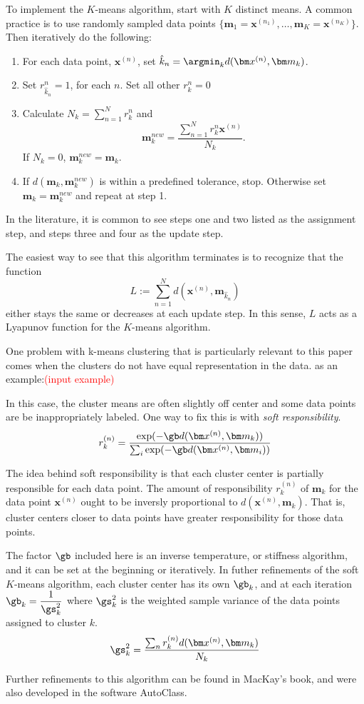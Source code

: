 To implement the \(K\)-means algorithm, start with \(K\) distinct means.  
A common practice is to use randomly sampled data points 
\(\{\bm m_1 = \bm x^{(n_1)},\ldots,\bm m_K = \bm x^{(n_K)}\}\). Then iteratively 
do the following:
\begin{enumerate}
	\item For each data point, \(\bm x^{(n)}\), set 
	\(\hat{k}_n = \argmin_k d(\bm x^{(n)},\bm m_k)\).
	\item Set \(r_{\hat{k}_n}^{n} = 1\), for each \(n\). Set all other 
	\(r_k^n = 0\)
	\item Calculate \(N_k = \sum_{n=1}^{N} r^n_k\) and 
	\[\bm m_k^{new} = \frac{\sum_{n=1}^{N} r_k^n \bm x^{(n)}}{N_k}.\]
	If \(N_k = 0\), \(\bm m_k^{new} = \bm m_k\).
	\item If \(d(\bm m_k ,\bm m_k^{new})\) is within a predefined tolerance, 
	stop.  Otherwise set \(\bm m_k = \bm m_k^{new}\) and repeat at step 1.
\end{enumerate}
In the literature, it is common to see steps one and two listed as the 
assignment step, and steps three and four as the update step.  

The easiest way to see that this algorithm terminates is to recognize that the 
function \[L := \sum_{n=1}^{N} d(\bm x^{(n)},\bm m_{\hat{k}_n})\]
either stays the same or decreases at each update step.  In this sense, \(L\) 
acts as a Lyapunov function for the \(K\)-means algorithm.

One problem with k-means clustering that is particularly relevant to this 
paper comes when the clusters do not have equal representation in the data.
as an example:\textcolor{red}{(input example)}

In this case, the cluster means are often slightly off center and some data 
points are be inappropriately labeled. %
One way to fix this is with \textit{soft responsibility}. 
\[r_k^{(n)} = \frac{\exp(-\gb d(\bm x^{(n)},\bm m_k))}
{\sum_i \exp(-\gb d(\bm x^{(n)},\bm m_i))}\]

The idea behind soft responsibility is that each cluster center is partially 
responsible for each data point.  The amount of responsibility \(r_k^{(n)}\) 
of \(\bm m_k\) for the data point \(\bm x^{(n)}\) ought to be inversly 
proportional to \(d(\bm x^{(n)},\bm m_k)\). That is, cluster centers closer to 
data points have greater responsibility for those data points.  

The factor \(\gb\) included here is an inverse temperature, or stiffness 
algorithm, and it can be set at the beginning or iteratively.  In futher 
refinements of the soft $K$-means algorithm, each cluster center has its own
\(\gb_k\), and at each iteration \(\gb_k = \dfrac{1}{\gs_k^2}\) where 
\(\gs_k^{2}\) is the weighted sample variance of the data points assigned to 
cluster $k$.
\[\gs_k^{2} = \frac{\sum_n r_k^{(n)}d(\bm x^{(n)},\bm m_k)}{N_k}\]

Further refinements to this algorithm can be found in MacKay's book, and were 
also developed in the software AutoClass. \cite{MacKay2002,AutoClass1,AutoClass2}

